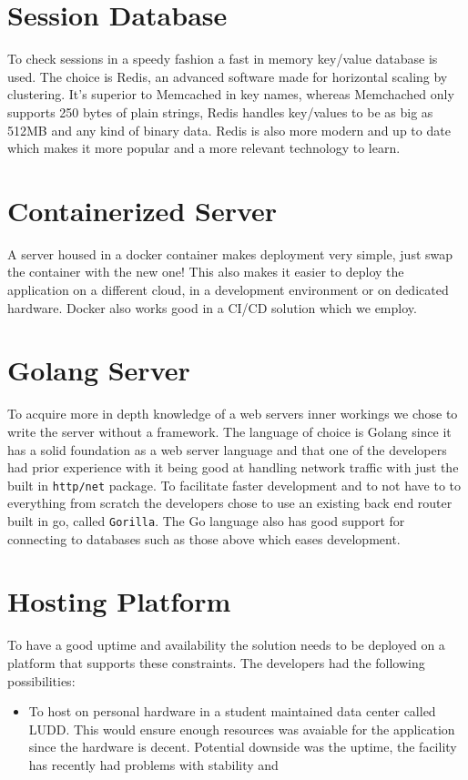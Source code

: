 \documentclass[12pt,a4paper]{report}
\begin{document}
\section{Session Database}
To check sessions in a speedy fashion a fast in memory key/value database is used. The choice is Redis, an advanced software made for horizontal scaling by clustering. It's superior to Memcached in key names, whereas Memchached only supports 250 bytes of plain strings, Redis handles key/values to be as big as 512MB and any kind of binary data. Redis is also more modern and up to date which makes it more popular and a more relevant technology to learn.

\section{Containerized Server}
A server housed in a docker container makes deployment very simple, just swap the container with the new one! This also makes it easier to deploy the application on a different cloud, in a development environment or on dedicated hardware. Docker also works good in a CI/CD solution which we employ.

\section{Golang Server}
To acquire more in depth knowledge of a web servers inner workings we chose to write the server without a framework. The language of choice is Golang since it has a solid foundation as a web server language and that one of the developers had prior experience with it being good at handling network traffic with just the built in \texttt{http/net} package. To facilitate faster development and to not have to to everything from scratch the developers chose to use an existing back end router built in go, called \texttt{Gorilla}.
The Go language also has good support for connecting to databases such as those above which eases development. 

\section{Hosting Platform}
To have a good uptime and availability the solution needs to be deployed on a platform that supports these constraints. The developers had the following possibilities:

\begin{itemize}
    \item To host on personal hardware in a student maintained data center called LUDD. This would ensure enough resources was avaiable for the application since the hardware is decent. Potential downside was the uptime, the facility has recently had problems with stability and 
\end{itemize}
\end{document}
